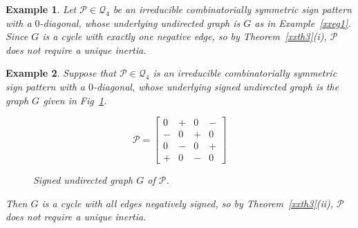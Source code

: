 \documentclass[a4paper, 10pt]{article}
\newtheorem{eg}{Example}[section]
\numberwithin{equation}{section}
\begin{document}
\begin{eg}
	Let $\mathcal{P}\in \mathcal{Q}_4$ be an irreducible combinatorially symmetric sign pattern with a $0$-diagonal, whose underlying undirected graph is $G$ as in Example~\ref{xxeg1}. Since $G$ is a cycle with exactly one negative edge, so by Theorem~\ref{xxth3}(i), $\mathcal{P}$ does not require a unique inertia.
\end{eg}

\begin{eg} Suppose that $\mathcal{P}\in \mathcal{Q}_4$ is an irreducible combinatorially symmetric sign pattern with a $0$-diagonal, whose underlying signed undirected graph is the graph $G$ given in Fig~\ref{xfig3.3}.
	\begin{figure}[H]
		\centering
		\begin{minipage}{.45\textwidth}
			\vspace{-1cm}
			\[
			\mathcal{P}=
			\begin{bmatrix}
				0 & + & 0 & - \\
				- & 0 & + & 0 \\
				0 & - & 0 & + \\
				+ & 0 & - & 0
			\end{bmatrix}
			\]
		\end{minipage}
		\hspace{0.05\textwidth}
		\begin{minipage}{.45\textwidth}
			\centering
			\tikzset{node distance=1cm}
			\caption{Signed undirected graph $ G$ of $\mathcal{P}$.}
			\label{xfig3.3}
		\end{minipage}
	\end{figure}
	
	Then $G$ is a cycle with all edges negatively signed, so by Theorem~\ref{xxth3}(ii), $\mathcal{P}$ does not require a unique inertia.
\end{eg}
\end{document}
